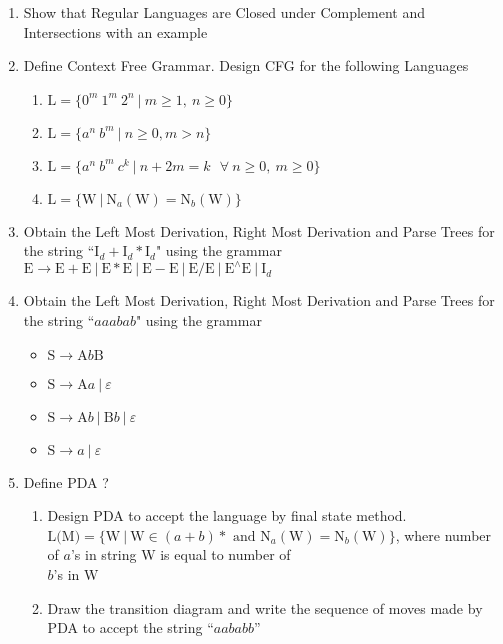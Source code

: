 \documentclass{article}
\begin{document}
\begin{enumerate}[label=\arabic*)]
\begin{figure}[H]
		\end{figure}
		
		\item Show that Regular Languages are Closed under Complement and Intersections with an example
	
		\item Define Context Free Grammar. Design CFG for the following Languages
		\begin{enumerate}[label=\roman*)]
			\item $\text{L} = \{0^m\ 1^m\ 2^n~|~m \ge 1,~n \ge 0\}$
			\item $\text{L} = \{a^n\ b^m~|~n \ge 0, m>n\}$
			\item $\text{L} = \{a^n\ b^m\ c^k~|~n+2m=k ~~~\forall~n \ge 0,~m \ge 0\}$
			\item $\text{L} = \{\text{W}~|~\text{N}_a(\text{W})=\text{N}_b(\text{W})\}$
		\end{enumerate}
	
		\item Obtain the Left Most Derivation, Right Most Derivation and Parse Trees for the string
			``$\text{I}_d+\text{I}_d \ast \text{I}_d$" using the grammar
			$\text{E} \to \text{E}+\text{E}~|~\text{E} \ast \text{E}~|~\text{E}-\text{E}~|~\text{E}/\text{E}~|~
				\text{E} ^\wedge \text{E}~|~\text{I}_d$
	
		\item Obtain the Left Most Derivation, Right Most Derivation and Parse Trees for the string ``$aaabab$"
			using the grammar
			\begin{itemize}[label=]
				\item $\text{S} \to \text{A}b\text{B}$
				\item $\text{S} \to \text{A}a~|~\varepsilon$
				\item $\text{S} \to \text{A}b~|~\text{B}b~|~\varepsilon$
				\item $\text{S} \to a~|~\varepsilon$
			\end{itemize}
	
		\item Define PDA ?
		\begin{enumerate}[label=\roman*)]
			\item Design PDA to accept the language by final state method. \\
				$\text{L(M)} = \{\text{W}~|~\text{W} \in (a+b) \ast \text{ and } \text{N}_a(\text{W}) = 
				\text{N}_b(\text{W})\}$, where number of $a$'s in string W is equal to number of \\ $b$'s in W
			\item Draw the transition diagram and write the sequence of moves made by PDA to accept the string
				``$aababb$''
		\end{enumerate}
	

\end{enumerate}
\end{document}
